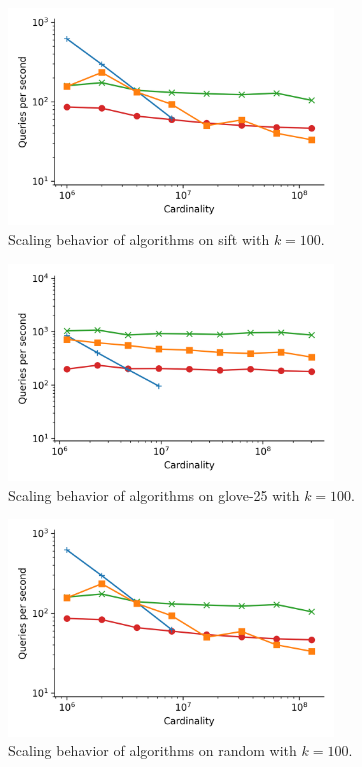 \documentclass[review,supplement,onefignum,onetabnum]{siamonline220329}
\begin{document}
\begin{figure}[ht!]
    \centering
    \includegraphics[width=3.4in]{plots/sift_PermutedBall_100_throughput.png}
    \caption{
        Scaling behavior of algorithms on sift with $k=100$.
    }
    \label{fig:supplement:sift-k-100}
\end{figure}

\begin{figure}[ht!]
    \centering
    \includegraphics[width=3.4in]{plots/glove-25_PermutedBall_100_throughput.png}
    \caption{
        Scaling behavior of algorithms on glove-25 with $k=100$.
    }
    \label{fig:supplement:glove-25-k-100}
\end{figure}

\begin{figure}[ht!]
    \centering
    \includegraphics[width=3.4in]{plots/sift_PermutedBall_100_throughput.png}
    \caption{
        Scaling behavior of algorithms on random with $k=100$.
    }
    \label{fig:supplement:random-k-100}
\end{figure}
\end{document}
